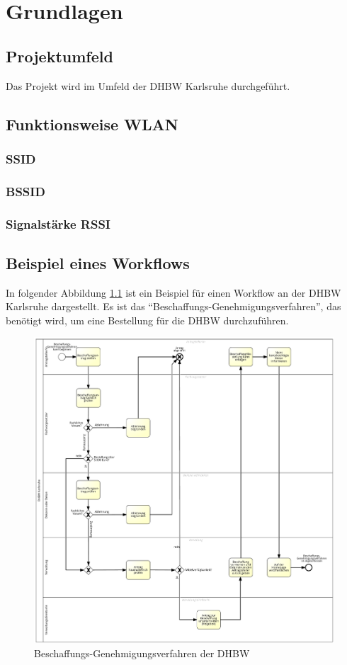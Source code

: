 \chapter{Grundlagen}

\section{Projektumfeld}

Das Projekt wird im Umfeld der \gls{DHBW} Karlsruhe durchgeführt.

\section{Funktionsweise WLAN}

\subsection{SSID}

\subsection{BSSID}

\subsection{Signalstärke RSSI}

\section{Beispiel eines Workflows}

In folgender Abbildung \ref{fig:beschaffungsverfahren} ist ein Beispiel für einen Workflow an der \gls{DHBW} Karlsruhe dargestellt.
Es ist das \enquote{Beschaffungs-Genehmigungsverfahren}, das benötigt wird, um eine Bestellung für die \gls{DHBW} durchzuführen.

\begin{figure}
	\includegraphics[width=\textwidth]{images/beschaffungs-genehmigungsverfahren.png} 
	\centering
	\caption{Beschaffungs-Genehmigungsverfahren der \gls{DHBW}}
	\label{fig:beschaffungsverfahren}
\end{figure} 

